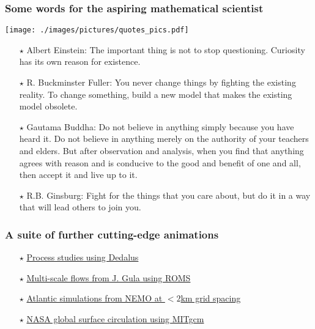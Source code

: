 \documentclass[10pt]{beamer}
\begin{document}
\begin{frame}
  \frametitle{Some words for the aspiring mathematical scientist}


\begin{center}
\vspace{-.4cm}
{\texttt{[image: ./images/pictures/quotes\_pics.pdf]}}
\end{center}

\vspace{-.4cm}

\begin{exampleblock}{}

\small 
\begin{itemize} 

\item[$\star$] {\sc Albert Einstein:} The important thing is not to
  stop questioning. Curiosity has its own reason for existence.

\item[$\star$] {\sc R. Buckminster Fuller:} You never change things by
  fighting the existing reality. To change something, build a new
  model that makes the existing model obsolete.

\item[$\star$] {\sc Gautama Buddha:} Do not believe in anything simply
  because you have heard it.  Do not believe in anything merely on the
  authority of your teachers and elders. But after observation and
  analysis, when you find that anything agrees with reason and is
  conducive to the good and benefit of one and all, then accept it and
  live up to it.


\item[$\star$] {\sc R.B. Ginsburg:} Fight for the things that you care
  about, but do it in a way that will lead others to join you.


\end{itemize}

\end{exampleblock}{}

\end{frame}


\begin{frame}
  \frametitle{A suite of further cutting-edge animations}

\begin{itemize} 

\item[$\star$] 
\href{https://vimeo.com/dedalus}{Process studies using Dedalus}

\item[$\star$] 
\href{http://stockage.univ-brest.fr/~gula/movies.html}{Multi-scale flows from J. Gula using ROMS}

\item[$\star$] 
\href{https://vimeo.com/oceannext}{Atlantic simulations from NEMO at $<2$km grid spacing}

\item[$\star$] 
\href{https://www.youtube.com/watch?v=CCmTY0PKGDs}{NASA global surface circulation using MITgcm}


\end{itemize}

\end{frame}
\end{document}
